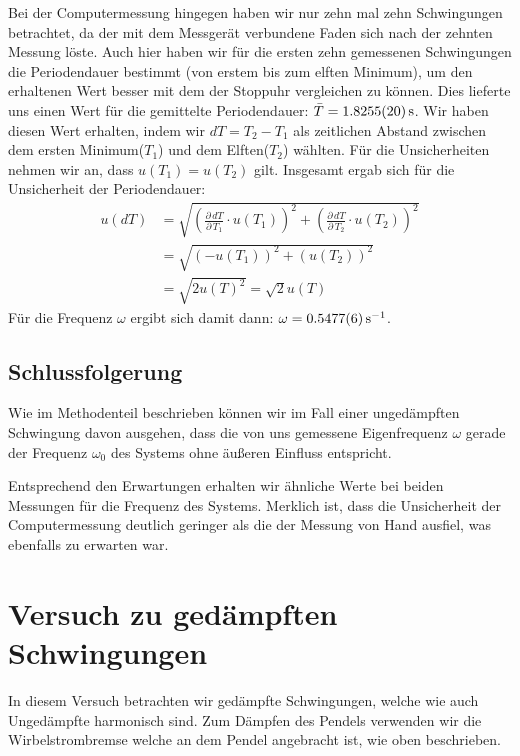 \documentclass[11pt,a4paper,titlepage, ngerman]{article}
\begin{document}
			Bei der Computermessung hingegen haben wir nur zehn mal zehn Schwingungen betrachtet, da der mit dem Messgerät verbundene Faden sich nach der zehnten Messung löste.
			Auch hier haben wir für die ersten zehn gemessenen Schwingungen die Periodendauer bestimmt (von erstem bis zum elften Minimum), um den erhaltenen Wert besser mit dem der Stoppuhr vergleichen zu können. 
			Dies lieferte uns einen Wert für die gemittelte Periodendauer: $\bar{T}=\SI{1,8255+-0,0020}{s}$.
			Wir haben diesen Wert erhalten, indem wir $dT = T_2 - T_1$ als zeitlichen Abstand zwischen dem ersten Minimum($T_1$) und dem Elften($T_2$) wählten. Für die Unsicherheiten nehmen wir an, dass
			$u(T_1) = u(T_2)$ gilt. Insgesamt ergab sich für die Unsicherheit der Periodendauer:
			\begin{align}
				u(dT) &= \sqrt{\left( \frac{\partial\,dT}{\partial\,T_1} \cdot u(T_1)\right)^2 +\left( \frac{\partial\,dT}{\partial\,T_2} \cdot u(T_2)\right)^2}\\
				&= \sqrt{(-u(T_1))^2 + (u(T_2))^2}\\
				&= \sqrt{2 u(T)^2} = \sqrt{2} u(T)
			\end{align}		
			Für die Frequenz $\omega$ ergibt sich damit dann: $\omega=\SI{0,5477+-0,0006}{\per\second}$.
					
		\subsection*{Schlussfolgerung}
			
			Wie im Methodenteil beschrieben können wir im Fall einer ungedämpften Schwingung davon ausgehen, dass die von uns gemessene Eigenfrequenz $\omega$ gerade der Frequenz $\omega_0$ des Systems ohne äußeren Einfluss entspricht. 
			
			Entsprechend den Erwartungen erhalten wir ähnliche Werte bei beiden Messungen für die Frequenz des Systems. Merklich ist, dass die Unsicherheit der Computermessung deutlich geringer als die der Messung von Hand ausfiel, was ebenfalls zu erwarten war.
				
	\section{Versuch zu gedämpften Schwingungen}
		
		In diesem Versuch betrachten wir gedämpfte Schwingungen, welche wie auch Ungedämpfte harmonisch sind.
		Zum Dämpfen des Pendels verwenden wir die Wirbelstrombremse welche an dem Pendel angebracht ist, wie oben beschrieben. 
				
\end{document}
